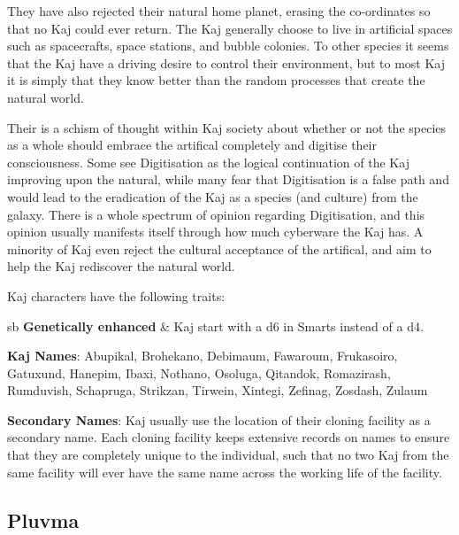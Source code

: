 \documentclass[10pt,twoside]{article}
\newenvironment{standardtable}{
    \par\vspace*{8pt}
    \noindent
    \fontfamily{lmss}\selectfont %
    \rowcolors{1}{bgtan}{commentgreen} %
    \tabularx
}
{\vspace{8pt plus 1pt}\noindent\endtabularx}
\begin{document}
\begin{multicols}{2}
  They have also rejected their natural home planet, erasing the co-ordinates so that no Kaj could ever return. The Kaj generally choose to live in artificial spaces such as spacecrafts, space stations, and bubble colonies. To other species it seems that the Kaj have a driving desire to control their environment, but to most Kaj it is simply that they know better than the random processes that create the natural world.
  
  Their is a schism of thought within Kaj society about whether or not the species as a whole should embrace the artifical completely and digitise their consciousness. Some see Digitisation as the logical continuation of the Kaj improving upon the natural, while many fear that Digitisation is a false path and would lead to the eradication of the Kaj as a species (and culture) from the galaxy. There is a whole spectrum of opinion regarding Digitisation, and this opinion usually manifests itself through how much cyberware the Kaj has. A minority of Kaj even reject the cultural acceptance of the artifical, and aim to help the Kaj rediscover the natural world.
  
  Kaj characters have the following traits:
  \begin{standardtable}{\linewidth}{sb}
    \textbf{Genetically enhanced} & Kaj start with a d6 in Smarts instead of a d4.\\
  \end{standardtable}
  
  \textbf{Kaj Names}: Abupikal, Brohekano, Debimaum, Fawaroum, Frukasoiro, Gatuxund, Hanepim, Ibaxi, Nothano, Osoluga, Qitandok, Romazirash, Rumduvish, Schapruga, Strikzan, Tirwein, Xintegi, Zefinag, Zosdash, Zulaum
  
  \textbf{Secondary Names}: Kaj usually use the location of their cloning facility as a secondary name. Each cloning facility keeps extensive records on names to ensure that they are completely unique to the individual, such that no two Kaj from the same facility will ever have the same name across the working life of the facility. 
  
  \columnbreak
  
  \subsection{Pluvma}
  

\end{multicols}
\end{document}
